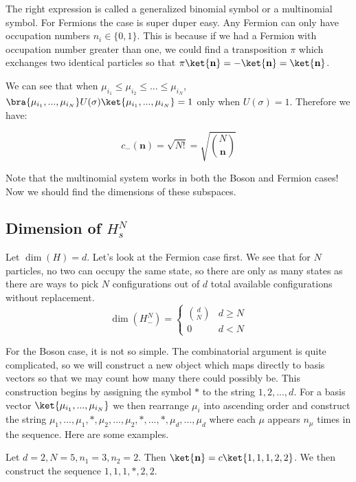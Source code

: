 \documentclass{article}
\newcommand{\ve}[1]{\mathbf{#1}}
\begin{document}
The right expression is called a generalized binomial symbol or a multinomial symbol. For Fermions the case is super duper easy. Any Fermion can only have occupation numbers $n_i \in \{0,1\}$. This is because if we had a Fermion with occupation number greater than one, we could find a transposition $\pi$ which exchanges two identical particles so that $\pi\ket{\ve{n}} = -\ket{\ve{n}} = \ket{\ve{n}}$. 

We can see that when $\mu_{i_1}\leq\mu_{i_2}\leq...\leq\mu_{i_N}$, $\bra{\mu_{i_1},...,\mu_{i_N}}U(\sigma)\ket{\mu_{i_1},...,\mu_{i_N}}=1$ only when $U(\sigma) = 1$. Therefore we have:

\begin{equation}
c_-(\ve{n}) = \sqrt{N!} = \sqrt{{N\choose{\ve{n}}}}
\end{equation}

Note that the multinomial system works in both the Boson and Fermion cases! Now we should find the dimensions of these subspaces.

\subsection{Dimension of $H_s^N$}

Let $\dim(H)=d$. Let's look at the Fermion case first. We see that for $N$ particles, no two can occupy the same state, so there are only as many states as there are ways to pick $N$ configurations out of $d$ total available configurations without replacement.
\begin{equation}
\dim(H_{-}^N) = \begin{cases}  {d\choose N} & d\geq N \\ 0 & d < N\end{cases}
\end{equation}

For the Boson case, it is not so simple. The combinatorial argument is quite complicated, so we will construct a new object which maps directly to basis vectors so that we may count how many there could possibly be. This construction begins by assigning the symbol $*$ to the string $1,2,...,d$. For a basis vector $\ket{\mu_{i_1},...,\mu_{i_N}}$ we then rearrange $\mu_i$ into ascending order and construct the string $\mu_{1},...,\mu_{1},*,\mu_{2},...,\mu_{2},*,...,*,\mu_{d},...,\mu_d$ where each $\mu$ appears $n_\mu$ times in the sequence. Here are some examples.

Let $d=2,N=5,n_1=3,n_2=2$. Then $\ket{\ve{n}} = c\ket{1,1,1,2,2}$. We then construct the sequence $1,1,1,*,2,2$.
\end{document}
